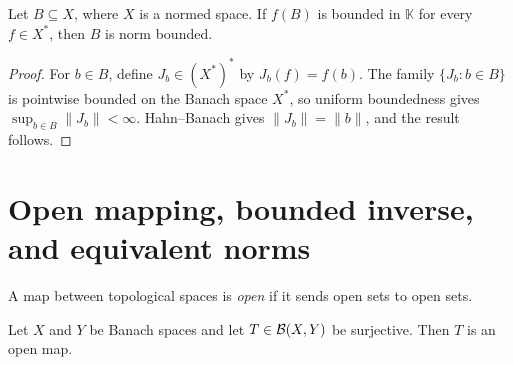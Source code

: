 \begin{notetheorem}
Let $B\subseteq X$, where $X$ is a normed space.  If $f(B)$ is bounded in
$\mathbb K$ for every $f\in X^*$, then $B$ is norm bounded.
\end{notetheorem}

\begin{proof}
For $b\in B$, define $J_b\in(X^*)^*$ by $J_b(f)=f(b)$.  The family
$\{J_b:b\in B\}$ is pointwise bounded on the Banach space $X^*$, so uniform
boundedness gives $\sup_{b\in B}\|J_b\|<\infty$.  Hahn--Banach gives
$\|J_b\|=\|b\|$, and the result follows.
\end{proof}

\section{Open mapping, bounded inverse, and equivalent norms}

\begin{notedefinition}
A map between topological spaces is \emph{open} if it sends open sets to open
sets.
\end{notedefinition}

\begin{notetheorem}
Let $X$ and $Y$ be Banach spaces and let $T\in\mathcal{B}(X,Y)$ be surjective.  Then
$T$ is an open map.
\end{notetheorem}

